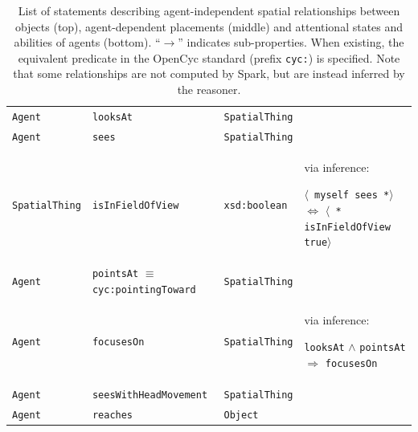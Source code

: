 \documentclass[preprint,3p,times]{elsarticle}
\newcommand{\concept}[1]{{\small \texttt{#1}}}
\newcommand{\stmt}[1]{{\footnotesize \tt $\langle$ #1\relax$\rangle$}}
\begin{document}
\begin{table}[h]
\begin{tabular}{p{1.5cm}lp{2cm}p{3.7cm}}
		\hline
		 \concept{Agent}  & \concept{looksAt}  & \concept{SpatialThing} \\
		 \concept{Agent}  & \concept{sees}  &  \concept{SpatialThing}  &    \\ 
		 \concept{SpatialThing}  & \concept{isInFieldOfView}  &  \concept{xsd:boolean}  & via inference: \par \tiny \stmt{myself sees *} $\Leftrightarrow$ \stmt{* isInFieldOfView true} \\ 
		 \concept{Agent}  & \concept{pointsAt} $\equiv$ \concept{cyc:pointingToward}  & \concept{SpatialThing} \\ 
		 \concept{Agent}  & \concept{focusesOn}  &  \concept{SpatialThing}  &  via inference: \par \tiny \concept{looksAt} $\wedge$ \concept{pointsAt} $\Rightarrow$ \concept{focusesOn} \\
		\concept{Agent} & \concept{seesWithHeadMovement} &  \concept{SpatialThing} \\
		\concept{Agent} & \concept{reaches} &  \concept{Object} \\ 

	\end{tabular}

    \caption{List of statements describing agent-independent spatial
        relationships between objects (top), agent-dependent placements (middle)
        and attentional states and abilities of agents (bottom).
        ``$\rightarrow$'' indicates sub-properties. When existing, the
        equivalent predicate in the {\sc OpenCyc} standard (prefix \concept{cyc:})
        is specified. Note that some relationships are not computed by {\sc Spark}, but
        are instead inferred by the reasoner.}

	\label{facts}
\end{table}
\renewcommand{\concept}[1]{{\small \texttt{#1}}}
\end{document}
